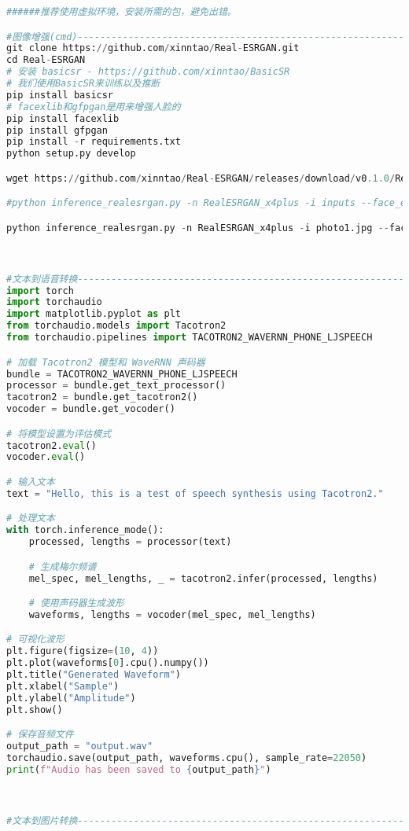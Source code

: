 \documentclass{article}
\begin{document}
\begin{lstlisting}[language=Python]
    ######推荐使用虚拟环境，安装所需的包，避免出错。

#图像增强(cmd)-------------------------------------------------------------------
git clone https://github.com/xinntao/Real-ESRGAN.git
cd Real-ESRGAN
# 安装 basicsr - https://github.com/xinntao/BasicSR
# 我们使用BasicSR来训练以及推断
pip install basicsr
# facexlib和gfpgan是用来增强人脸的
pip install facexlib
pip install gfpgan
pip install -r requirements.txt
python setup.py develop

wget https://github.com/xinntao/Real-ESRGAN/releases/download/v0.1.0/RealESRGAN_x4plus.pth -P weights

#python inference_realesrgan.py -n RealESRGAN_x4plus -i inputs --face_enhance

python inference_realesrgan.py -n RealESRGAN_x4plus -i photo1.jpg --face_enhance -o output_folder



#文本到语音转换-----------------------------------------------------------------
import torch
import torchaudio
import matplotlib.pyplot as plt
from torchaudio.models import Tacotron2
from torchaudio.pipelines import TACOTRON2_WAVERNN_PHONE_LJSPEECH

# 加载 Tacotron2 模型和 WaveRNN 声码器
bundle = TACOTRON2_WAVERNN_PHONE_LJSPEECH
processor = bundle.get_text_processor()
tacotron2 = bundle.get_tacotron2()
vocoder = bundle.get_vocoder()

# 将模型设置为评估模式
tacotron2.eval()
vocoder.eval()

# 输入文本
text = "Hello, this is a test of speech synthesis using Tacotron2."

# 处理文本
with torch.inference_mode():
    processed, lengths = processor(text)

    # 生成梅尔频谱
    mel_spec, mel_lengths, _ = tacotron2.infer(processed, lengths)

    # 使用声码器生成波形
    waveforms, lengths = vocoder(mel_spec, mel_lengths)

# 可视化波形
plt.figure(figsize=(10, 4))
plt.plot(waveforms[0].cpu().numpy())
plt.title("Generated Waveform")
plt.xlabel("Sample")
plt.ylabel("Amplitude")
plt.show()

# 保存音频文件
output_path = "output.wav"
torchaudio.save(output_path, waveforms.cpu(), sample_rate=22050)
print(f"Audio has been saved to {output_path}")



#文本到图片转换-----------------------------------------------------------------


\end{lstlisting}
\end{document}
